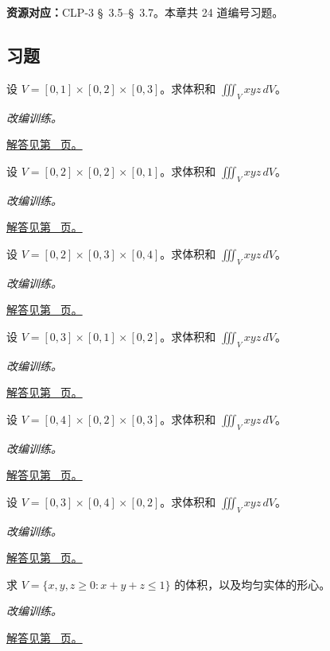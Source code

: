 \documentclass[12pt,fontset=fandol]{ctexart}
\begin{document}
\textbf{资源对应：}CLP-3 \S~3.5--\S~3.7。本章共 24 道编号习题。
\subsection{习题}
\begin{example}[长方体上的体积矩]\label{ex:c38q1}
设 $V=[0,1]\times[0,2]\times[0,3]$。求体积和 $\displaystyle\iiint_Vxyz\,dV$。
\par\textit{改编训练。}\par\hyperref[ans:c38q1]{解答见第~\pageref{ans:c38q1} 页。}
\end{example}
\begin{example}[长方体上的体积矩]\label{ex:c38q2}
设 $V=[0,2]\times[0,2]\times[0,1]$。求体积和 $\displaystyle\iiint_Vxyz\,dV$。
\par\textit{改编训练。}\par\hyperref[ans:c38q2]{解答见第~\pageref{ans:c38q2} 页。}
\end{example}
\begin{example}[长方体上的体积矩]\label{ex:c38q3}
设 $V=[0,2]\times[0,3]\times[0,4]$。求体积和 $\displaystyle\iiint_Vxyz\,dV$。
\par\textit{改编训练。}\par\hyperref[ans:c38q3]{解答见第~\pageref{ans:c38q3} 页。}
\end{example}
\begin{example}[长方体上的体积矩]\label{ex:c38q4}
设 $V=[0,3]\times[0,1]\times[0,2]$。求体积和 $\displaystyle\iiint_Vxyz\,dV$。
\par\textit{改编训练。}\par\hyperref[ans:c38q4]{解答见第~\pageref{ans:c38q4} 页。}
\end{example}
\begin{example}[长方体上的体积矩]\label{ex:c38q5}
设 $V=[0,4]\times[0,2]\times[0,3]$。求体积和 $\displaystyle\iiint_Vxyz\,dV$。
\par\textit{改编训练。}\par\hyperref[ans:c38q5]{解答见第~\pageref{ans:c38q5} 页。}
\end{example}
\begin{example}[长方体上的体积矩]\label{ex:c38q6}
设 $V=[0,3]\times[0,4]\times[0,2]$。求体积和 $\displaystyle\iiint_Vxyz\,dV$。
\par\textit{改编训练。}\par\hyperref[ans:c38q6]{解答见第~\pageref{ans:c38q6} 页。}
\end{example}
\begin{example}[四面体体积与形心]\label{ex:c38q7}
求 $V=\{x,y,z\ge0:x+y+z\le 1\}$ 的体积，以及均匀实体的形心。
\par\textit{改编训练。}\par\hyperref[ans:c38q7]{解答见第~\pageref{ans:c38q7} 页。}
\end{example}
\end{document}
